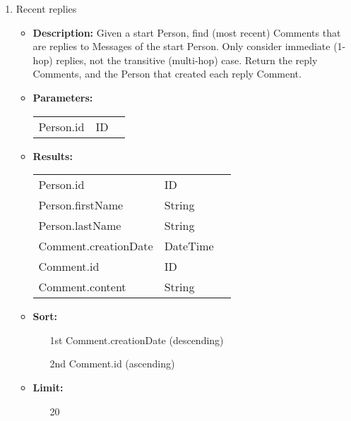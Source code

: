{\begin{enumerate}
    \item Recent replies
        \begin{itemize}
            \item \textbf{Description:}
                Given a start Person, find (most recent) Comments that are replies
                to Messages of the start Person. Only consider immediate
                (1-hop) replies, not the transitive (multi-hop) case.  Return the
                reply Comments, and the Person that created each reply
                Comment.
            \item \textbf{Parameters:} \\
                \begin{tabular}{lll}
                    Person.id 	 						& ID & \parbox[t]{20cm}{\par \strut} \\
                \end{tabular}
            \item \textbf{Results:} \\
                \begin{tabular}{lll}
                    Person.id 	 				& ID & \parbox[t]{20cm}{\par \strut} \\
                    Person.firstName 	 		& String & \parbox[t]{20cm}{\par \strut} \\
                    Person.lastName 	 		& String & \parbox[t]{20cm}{\par \strut} \\
                    Comment.creationDate 	 	& DateTime & \parbox[t]{20cm}{\par \strut} \\
                    Comment.id 	 				& ID & \parbox[t]{20cm}{\par \strut} \\
                    Comment.content 	 		& String & \parbox[t]{20cm}{\par \strut} \\
                \end{tabular}
             \item \textbf{Sort:}
                  \begin{itemize}
                    \item[1st] Comment.creationDate (descending)
                    \item[2nd] Comment.id (ascending)
                  \end{itemize}
              \item \textbf{Limit:}
                  \begin{itemize}
                    \item[] 20
                  \end{itemize}
        \end{itemize}


\end{enumerate}}
